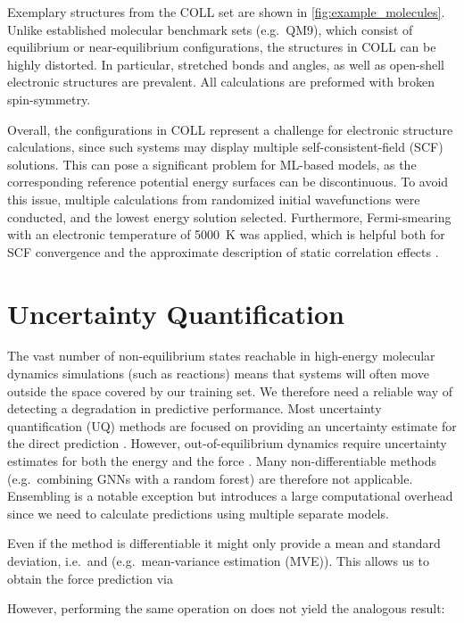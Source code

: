 \documentclass{article}
\begin{document}
Exemplary structures from the \textsc{COLL} set are shown in \cref{fig:example_molecules}. Unlike established molecular benchmark sets (e.g.\ QM9), which consist of equilibrium or near-equilibrium configurations, the structures in \textsc{COLL} can be highly distorted. In particular, stretched bonds and angles, as well as open-shell electronic structures are prevalent. All calculations are preformed with broken spin-symmetry.

Overall, the configurations in \textsc{COLL} represent a challenge for electronic structure calculations, since such systems may display multiple self-consistent-field (SCF) solutions. This can pose a significant problem for ML-based models, as the corresponding reference potential energy surfaces can be discontinuous. To avoid this issue, multiple calculations from randomized initial wavefunctions were conducted, and the lowest energy solution selected. Furthermore, Fermi-smearing with an electronic temperature of \SI{5000}{\kelvin} was applied, which is helpful both for SCF convergence and the approximate description of static correlation effects \cite{grimme_practicable_2015}.

\section{Uncertainty Quantification}

The vast number of non-equilibrium states reachable in high-energy molecular dynamics simulations (such as reactions) means that systems will often move outside the space covered by our training set. We therefore need a reliable way of detecting a degradation in predictive performance. Most uncertainty quantification (UQ) methods are focused on providing an uncertainty estimate for the direct prediction \cite{musil_fast_2019,hirschfeld_uncertainty_2020}. However, out-of-equilibrium dynamics require uncertainty estimates for both the energy  and the force . Many non-differentiable methods (e.g.\ combining GNNs with a random forest) are therefore not applicable. Ensembling is a notable exception but introduces a large computational overhead since we need to calculate predictions using multiple separate models.

Even if the method is differentiable it might only provide a mean and standard deviation, i.e.\  and  (e.g.\ mean-variance estimation (MVE)). This allows us to obtain the force prediction via

However, performing the same operation on  does not yield the analogous result:
\end{document}
